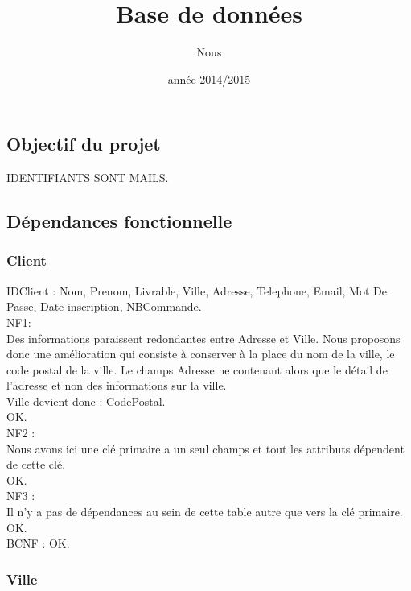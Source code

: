 \documentclass[a4paper, 12pt]{report}
\title{Base de données}
\author{Nous}
\date{année 2014/2015}
\begin{document}
	\begin{spacing}{1.2}
\maketitle%
\newpage

\textcolor{colortitre1}{\section*{Objectif du projet}} 


IDENTIFIANTS SONT MAILS.

\textcolor{colortitre2}{\subsection*{Dépendances fonctionnelle}} 

\textcolor{colortitre3}{\subsubsection*{Client}}
	
IDClient : Nom, Prenom, Livrable, Ville, Adresse, Telephone, Email, Mot De Passe, Date inscription, NBCommande.\\

NF1:\\
Des informations paraissent redondantes entre Adresse et Ville. Nous proposons donc une amélioration qui consiste à conserver à la place du nom de la ville, le code postal de la ville. Le champs Adresse ne contenant alors que le détail de l'adresse et non des informations sur la ville.\\
Ville devient donc : CodePostal.
\\OK.\\
NF2 : \\
Nous avons ici une clé primaire a un seul champs et tout les attributs dépendent de cette clé. \\OK.\\
NF3 : \\
Il n'y a pas de dépendances au sein de cette table autre que vers la clé primaire.\\ OK. \\
BCNF : OK.\\

\textcolor{colortitre3}{\subsubsection*{Ville}}


\end{spacing}
\end{document}
